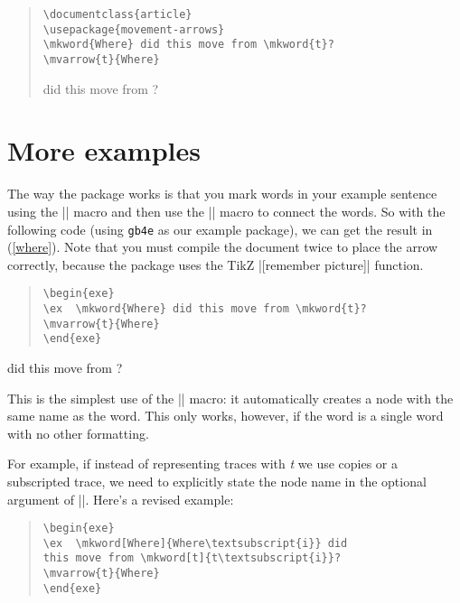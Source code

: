 \documentclass[11pt]{article}
\newcommand*{\pkg}[1]{\texttt{#1}}
\begin{document}
\begin{quote}
\begin{lstlisting}
\documentclass{article}
\usepackage{movement-arrows}
\mkword{Where} did this move from \mkword{t}?
\mvarrow{t}{Where}
\end{lstlisting}
 did this move from ?
\end{quote}

\section{More examples}
The way the package works is that you mark words in your example sentence using the |\mkword| macro and then use the |\mvarrow| macro to connect the words. So with the following code (using \pkg{gb4e} as our example package), we can get the result in (\ref{where}).  Note that you must compile the document twice to place the arrow correctly, because the package uses the TikZ |[remember picture]| function.


\begin{quote}
\begin{lstlisting}
\begin{exe}
\ex  \mkword{Where} did this move from \mkword{t}?
\mvarrow{t}{Where}
\end{exe}
\end{lstlisting}
\end{quote}

\begin{exe}
\ex  {} did this move from ?
\label{where}
\end{exe}

This is the simplest use of the |\mkword| macro: it automatically creates a node with the same name as the word.  This only works, however, if the word is a single word with no other formatting. 

For example, if instead of representing traces with \emph{t} we use copies or a subscripted trace, we need to explicitly state the node name in the optional argument of |\mkword|.  Here’s a revised example:
\begin{quote}
\begin{lstlisting}
\begin{exe}
\ex  \mkword[Where]{Where\textsubscript{i}} did 
this move from \mkword[t]{t\textsubscript{i}}?
\mvarrow{t}{Where}
\end{exe}
\end{lstlisting}
\end{quote}
\end{document}
